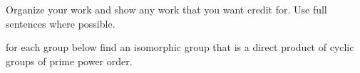 \documentclass[addpoints]{exam}
\begin{document}
Organize your work and show any work that you want credit for. Use full sentences where possible.

\begin{questions}

\question 
for each group below find an isomorphic group that is a direct product of cyclic groups of prime power order.


\end{questions}
\end{document}
